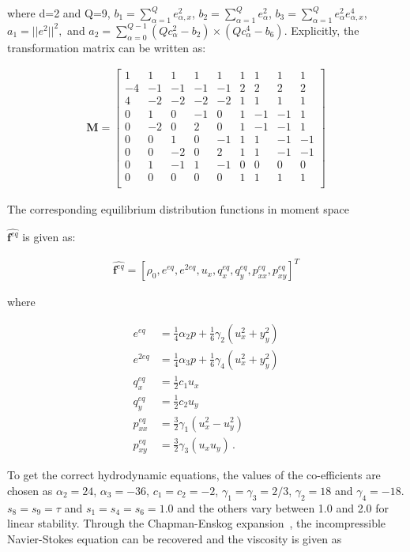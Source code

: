 \noindent where d=2 and Q=9, $b_1=\sum_{\alpha=1}^{Q}e_{\alpha,x}^2$, 
$b_2=\sum_{\alpha=1}^{Q}e_{\alpha}^2$, 
$b_3=\sum_{\alpha=1}^{Q}e_{\alpha}^2e_{\alpha,x}^4$, $a_1=||e^2||^2,$ and $a_2=\sum_{\alpha=0}^{Q-1}(Qc_{\alpha}^2-b_2)\times(Qc_{\alpha}^4-b_6)$. Explicitly, the transformation matrix can be written as:

\begin{align}
\mathbf{M}= \begin{bmatrix}
 1 &  1 &  1 &  1 &  1 &  1 &  1 &  1 &  1 \\
-4 & -1 & -1 & -1 & -1 &  2 &  2 &  2 &  2 \\ 
 4 & -2 & -2 & -2 & -2 &  1 &  1 &  1 &  1 \\
 0 &  1 &  0 & -1 &  0 &  1 & -1 & -1 &  1 \\
 0 & -2 &  0 &  2 &  0 &  1 & -1 & -1 &  1 \\
 0 &  0 &  1 &  0 & -1 &  1 &  1 & -1 & -1 \\
 0 &  0 & -2 &  0 &  2 &  1 &  1 & -1 & -1 \\
 0 &  1 & -1 &  1 & -1 &  0 &  0 &  0 &  0 \\
 0 &  0 &  0 &  0 &  0 &  1 &  1 &  1 &  1 \\
\end{bmatrix}
\end{align}

The corresponding equilibrium distribution functions in moment space 

$\widehat{\mathbf{f}^{eq}}$ is given as:

\begin{align}
\widehat{\mathbf{f}^{eq}}=\left[\rho_0,e^{eq},e^{2eq},u_x,q_x^{eq},q_y^{eq},p_{xx}^{eq},p_{xy}^{eq}\right]^T
\end{align}

\noindent where

\begin{align}
e^{eq} & = \frac{1}{4}\alpha_2p+\frac{1}{6}\gamma_2(u_x^2+y_y^2)\\
e^{2eq} & = \frac{1}{4}\alpha_3p+\frac{1}{6}\gamma_4(u_x^2+y_y^2)\\
q_x^{eq} & = \frac{1}{2}c_1u_x\\
q_y^{eq} & = \frac{1}{2}c_2u_y \\
p_{xx}^{eq} & = \frac{3}{2}\gamma_1(u_x^2 - u_y^2)\\
p_{xy}^{eq} & = \frac{3}{2}\gamma_3(u_xu_y) \,.
\end{align}

To get the correct hydrodynamic equations, the values of the co-efficients are 
chosen as $\alpha_2=24$,  $\alpha_3=-36$, $c_1=c_2=-2$, 
$\gamma_1=\gamma_3=2/3$, $\gamma_2=18$ and $\gamma_4=-18$. $s_8 = s_9 = \tau$ 
and $s_1=s_4=s_6=1.0$ and the others vary between 1.0 and 2.0 for linear 
stability. Through the Chapman-Enskog expansion~\citep{Du2006}, the 
incompressible Navier-Stokes equation can be recovered and the viscosity is 
given as

